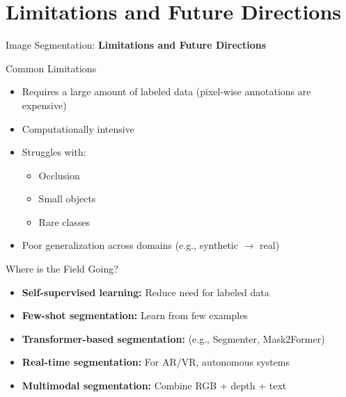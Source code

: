 \section{Limitations and Future Directions}
\begin{frame}{}
    \LARGE Image Segmentation: \textbf{Limitations and Future Directions}
\end{frame}

\begin{frame}{Common Limitations}
    \begin{itemize}
        \item Requires a large amount of labeled data (pixel-wise annotations are expensive)
        \item Computationally intensive
        \item Struggles with:
        \begin{itemize}
            \item Occlusion
            \item Small objects
            \item Rare classes
        \end{itemize}
        \item Poor generalization across domains (e.g., synthetic $\rightarrow$ real)
    \end{itemize}
\end{frame}

\begin{frame}{Where is the Field Going?}
    \begin{itemize}
        \item \textbf{Self-supervised learning:} Reduce need for labeled data
        \item \textbf{Few-shot segmentation:} Learn from few examples
        \item \textbf{Transformer-based segmentation:} (e.g., Segmenter, Mask2Former)
        \item \textbf{Real-time segmentation:} For AR/VR, autonomous systems
        \item \textbf{Multimodal segmentation:} Combine RGB + depth + text
    \end{itemize}
\end{frame}